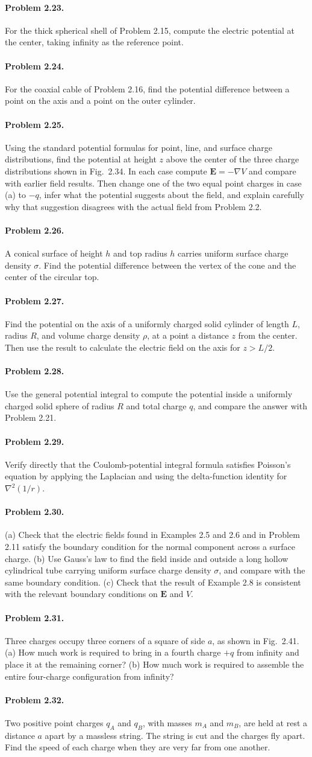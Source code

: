 \documentclass{aa}
\newcommand{\problemstatement}[2]{%
\paragraph{Problem #1.}#2\par\medskip
}
\begin{document}
\problemstatement{2.23}{For the thick spherical shell of Problem 2.15, compute the electric potential at the center, taking infinity as the reference point.}
\problemstatement{2.24}{For the coaxial cable of Problem 2.16, find the potential difference between a point on the axis and a point on the outer cylinder.}
\problemstatement{2.25}{Using the standard potential formulas for point, line, and surface charge distributions, find the potential at height \(z\) above the center of the three charge distributions shown in Fig.~2.34. In each case compute \(\mathbf E=-\nabla V\) and compare with earlier field results. Then change one of the two equal point charges in case (a) to \(-q\), infer what the potential suggests about the field, and explain carefully why that suggestion disagrees with the actual field from Problem 2.2.}
\problemstatement{2.26}{A conical surface of height \(h\) and top radius \(h\) carries uniform surface charge density \(\sigma\). Find the potential difference between the vertex of the cone and the center of the circular top.}
\problemstatement{2.27}{Find the potential on the axis of a uniformly charged solid cylinder of length \(L\), radius \(R\), and volume charge density \(\rho\), at a point a distance \(z\) from the center. Then use the result to calculate the electric field on the axis for \(z>L/2\).}
\problemstatement{2.28}{Use the general potential integral to compute the potential inside a uniformly charged solid sphere of radius \(R\) and total charge \(q\), and compare the answer with Problem 2.21.}
\problemstatement{2.29}{Verify directly that the Coulomb-potential integral formula satisfies Poisson's equation by applying the Laplacian and using the delta-function identity for \(\nabla^2(1/r)\).}
\problemstatement{2.30}{(a) Check that the electric fields found in Examples 2.5 and 2.6 and in Problem 2.11 satisfy the boundary condition for the normal component across a surface charge. (b) Use Gauss's law to find the field inside and outside a long hollow cylindrical tube carrying uniform surface charge density \(\sigma\), and compare with the same boundary condition. (c) Check that the result of Example 2.8 is consistent with the relevant boundary conditions on \(\mathbf E\) and \(V\).}
\problemstatement{2.31}{Three charges occupy three corners of a square of side \(a\), as shown in Fig.~2.41. (a) How much work is required to bring in a fourth charge \(+q\) from infinity and place it at the remaining corner? (b) How much work is required to assemble the entire four-charge configuration from infinity?}
\problemstatement{2.32}{Two positive point charges \(q_A\) and \(q_B\), with masses \(m_A\) and \(m_B\), are held at rest a distance \(a\) apart by a massless string. The string is cut and the charges fly apart. Find the speed of each charge when they are very far from one another.}
\end{document}
